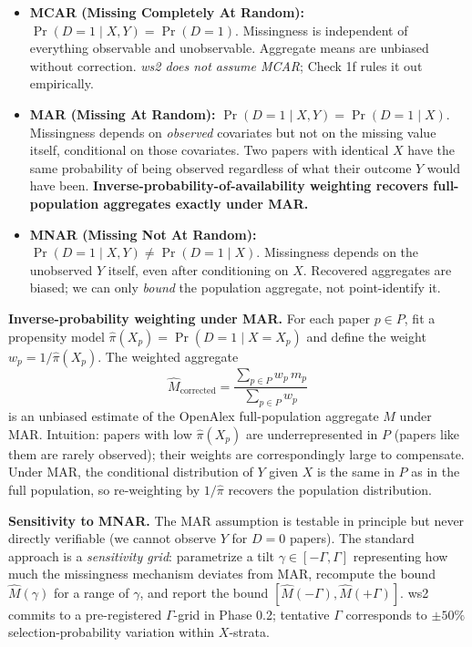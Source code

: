 \documentclass[11pt]{article}
\begin{document}
\begin{itemize}[nosep]
  \item \textbf{MCAR (Missing Completely At Random):}
        $\Pr(D = 1 \mid X, Y) = \Pr(D = 1)$. Missingness is independent
        of everything observable and unobservable. Aggregate means are
        unbiased without correction. \textit{ws2 does not assume MCAR};
        Check 1f rules it out empirically.
  \item \textbf{MAR (Missing At Random):}
        $\Pr(D = 1 \mid X, Y) = \Pr(D = 1 \mid X)$. Missingness depends
        on \emph{observed} covariates but not on the missing value
        itself, conditional on those covariates. Two papers with
        identical $X$ have the same probability of being observed
        regardless of what their outcome $Y$ would have been.
        \textbf{Inverse-probability-of-availability weighting recovers
        full-population aggregates exactly under MAR.}
  \item \textbf{MNAR (Missing Not At Random):}
        $\Pr(D = 1 \mid X, Y) \neq \Pr(D = 1 \mid X)$. Missingness
        depends on the unobserved $Y$ itself, even after conditioning
        on $X$. Recovered aggregates are biased; we can only
        \emph{bound} the population aggregate, not point-identify it.
\end{itemize}

\textbf{Inverse-probability weighting under MAR.} For each paper
$p \in P$, fit a propensity model
$\hat\pi(X_p) = \Pr(D = 1 \mid X = X_p)$ and define the weight
$w_p = 1 / \hat\pi(X_p)$. The weighted aggregate
\[
  \hat M_{\text{corrected}}
  = \frac{\sum_{p \in P} w_p \, m_p}{\sum_{p \in P} w_p}
\]
is an unbiased estimate of the OpenAlex full-population aggregate
$M$ under MAR. Intuition: papers with low $\hat\pi(X_p)$ are
underrepresented in $P$ (papers like them are rarely observed); their
weights are correspondingly large to compensate. Under MAR, the
conditional distribution of $Y$ given $X$ is the same in $P$ as in the
full population, so re-weighting by $1/\hat\pi$ recovers the population
distribution.

\textbf{Sensitivity to MNAR.} The MAR assumption is testable in
principle but never directly verifiable (we cannot observe $Y$ for
$D = 0$ papers). The standard approach is a \emph{sensitivity grid}:
parametrize a tilt $\gamma \in [-\Gamma, \Gamma]$ representing how much
the missingness mechanism deviates from MAR, recompute the bound
$\hat M(\gamma)$ for a range of $\gamma$, and report the bound
$[\hat M(-\Gamma), \hat M(+\Gamma)]$. ws2 commits to a pre-registered
$\Gamma$-grid in Phase 0.2; tentative $\Gamma$ corresponds to $\pm 50\%$
selection-probability variation within $X$-strata.
\end{document}
